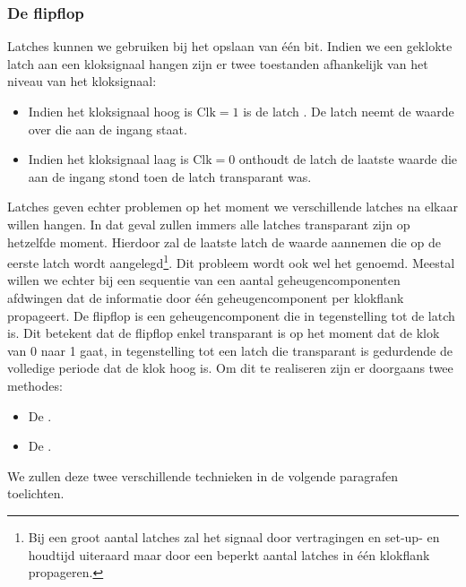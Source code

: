 \subsubsection{De flipflop}
Latches kunnen we gebruiken bij het opslaan van \'e\'en bit. Indien we een geklokte latch aan een kloksignaal hangen zijn er twee toestanden afhankelijk van het niveau van het kloksignaal:
\begin{itemize}
 \item Indien het kloksignaal hoog is $\mbox{Clk}=1$ is de latch . De latch neemt de waarde over die aan de ingang staat.
 \item Indien het kloksignaal laag is $\mbox{Clk}=0$ onthoudt de latch de laatste waarde die aan de ingang stond toen de latch transparant was.
\end{itemize}
Latches geven echter problemen op het moment we verschillende latches na elkaar willen hangen. In dat geval zullen immers alle latches transparant zijn op hetzelfde moment. Hierdoor zal de laatste latch de waarde aannemen die op de eerste latch wordt aangelegd\footnote{Bij een groot aantal latches zal het signaal door vertragingen en set-up- en houdtijd uiteraard maar door een beperkt aantal latches in \'e\'en klokflank propageren.}. Dit probleem wordt ook wel het  genoemd. Meestal willen we echter bij een sequentie van een aantal geheugencomponenten afdwingen dat de informatie door \'e\'en geheugencomponent per klokflank propageert. De flipflop is een geheugencomponent die in tegenstelling tot de latch  is. Dit betekent dat de flipflop enkel transparant is op het moment dat de klok van 0 naar 1 gaat, in tegenstelling tot een latch die transparant is gedurdende de volledige periode dat de klok hoog is. Om dit te realiseren zijn er doorgaans twee methodes:
\begin{itemize}
 \item De .
 \item De .
\end{itemize}
We zullen deze twee verschillende technieken in de volgende paragrafen toelichten.
